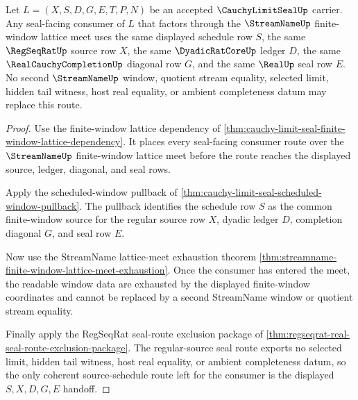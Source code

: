 \begin{theorem}
\label{thm:cauchy-limit-seal-source-schedule-lattice-coherence}
Let $L=(X,S,D,G,E,T,P,N)$ be an accepted $\CauchyLimitSealUp$ carrier. Any seal-facing consumer of $L$ that factors through the $\StreamNameUp$ finite-window lattice meet uses the same displayed schedule row $S$, the same $\RegSeqRatUp$ source row $X$, the same $\DyadicRatCoreUp$ ledger $D$, the same $\RealCauchyCompletionUp$ diagonal row $G$, and the same $\RealUp$ seal row $E$. No second $\StreamNameUp$ window, quotient stream equality, selected limit, hidden tail witness, host real equality, or ambient completeness datum may replace this route.
\end{theorem}
\begin{proof}
Use the finite-window lattice dependency of \autoref{thm:cauchy-limit-seal-finite-window-lattice-dependency}. It places every seal-facing consumer route over the $\StreamNameUp$ finite-window lattice meet before the route reaches the displayed source, ledger, diagonal, and seal rows.

Apply the scheduled-window pullback of \autoref{thm:cauchy-limit-seal-scheduled-window-pullback}. The pullback identifies the schedule row $S$ as the common finite-window source for the regular source row $X$, dyadic ledger $D$, completion diagonal $G$, and seal row $E$.

Now use the StreamName lattice-meet exhaustion theorem \autoref{thm:streamname-finite-window-lattice-meet-exhaustion}. Once the consumer has entered the meet, the readable window data are exhausted by the displayed finite-window coordinates and cannot be replaced by a second StreamName window or quotient stream equality.

Finally apply the RegSeqRat seal-route exclusion package of \autoref{thm:regseqrat-real-seal-route-exclusion-package}. The regular-source seal route exports no selected limit, hidden tail witness, host real equality, or ambient completeness datum, so the only coherent source-schedule route left for the consumer is the displayed $S,X,D,G,E$ handoff.
\end{proof}

